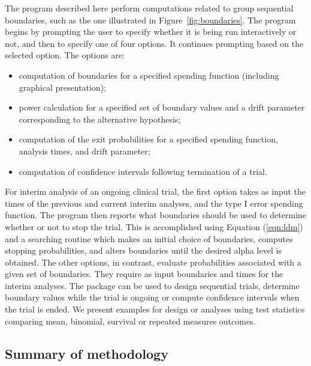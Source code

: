 The program described here perform computations related to group sequential
boundaries, such as the one illustrated in Figure~\ref{fig:boundaries}.  The
program begins by prompting the user to specify whether it is being run
interactively or not, and then to specify one of four options.  It
continues prompting based on the selected option.  The options are:
\begin{itemize}
\item computation of boundaries for a specified spending function
      (including graphical presentation);
\item power calculation for a specified set of boundary values and a
      drift parameter corresponding to the alternative hypothesis;
\item computation of the exit probabilities for a specified spending
      function, analysis times, and drift parameter;
\item computation of confidence intervals following termination of a trial.
\end{itemize}
For interim analysis of an ongoing clinical trial, the first option takes
as input the times of the previous and current interim analyses, and the
type I error spending function.  The program then reports what boundaries
should be used to determine whether or not to stop the trial.  This is
accomplished using Equation (\ref{eqn:ldm}) and a searching routine which
makes an initial choice of boundaries, computes stopping probabilities, and
alters boundaries until the desired alpha level is obtained.  The other
options, in contrast, evaluate probabilities associated with a given set of
boundaries.  They require as input boundaries and times for the interim
analyses.
The package can be used to design sequential trials, determine boundary
values while the trial is ongoing or compute confidence intervals when the
trial is ended.  We present examples for design or analyses using test
statistics comparing mean, binomial, survival or repeated measures
outcomes.

\subsection*{Summary of methodology}


